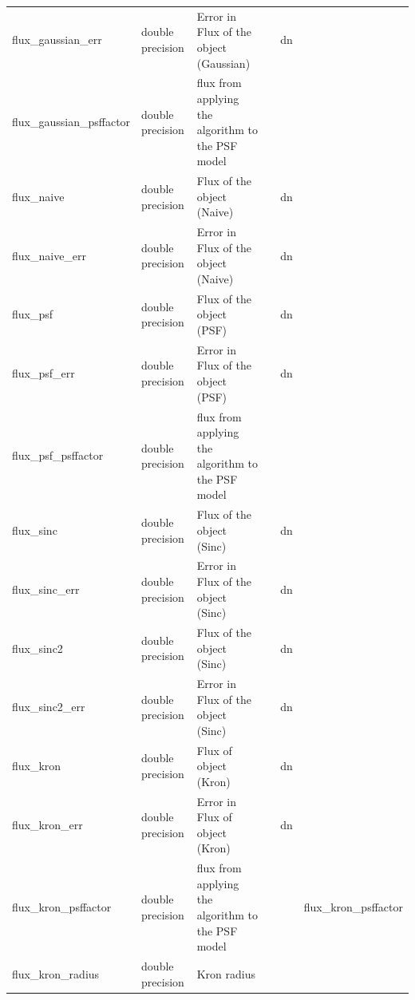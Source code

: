 \documentclass[12pt]{article}
\begin{document}
\begin{table}[thpb]
\begin{center}
{\begin{tabular}{llllll}
flux\_gaussian\_err & double precision & Error in Flux of the object (Gaussian)              &                            & dn         &   \\
flux\_gaussian\_psffactor & double precision & flux from applying the algorithm to the PSF model &                            &             &   \\
flux\_naive & double precision & Flux of the object (Naive)                          &                            & dn         &   \\
flux\_naive\_err & double precision & Error in Flux of the object (Naive)                 &                            & dn         &   \\
flux\_psf & double precision & Flux of the object (PSF)                            &                            & dn         &   \\
flux\_psf\_err & double precision & Error in Flux of the object (PSF)                   &                            & dn         &   \\
flux\_psf\_psffactor & double precision &  flux  from applying the algorithm to the PSF model  &                            &             &   \\
flux\_sinc & double precision & Flux of the object (Sinc)                           &                            & dn         &   \\
flux\_sinc\_err & double precision & Error in Flux of the object (Sinc)                  &                            & dn         &   \\
flux\_sinc2 & double precision & Flux of the object (Sinc)                           &                            & dn         &   \\
flux\_sinc2\_err & double precision & Error in Flux of the object (Sinc)                  &                            & dn         &   \\
flux\_kron & double precision & Flux of object (Kron)                               &                            & dn         &   \\
flux\_kron\_err & double precision & Error in Flux of object (Kron)                      &                            & dn         &   \\
flux\_kron\_psffactor & double precision & flux from applying the algorithm to the PSF model   &                  &             & flux\_kron\_psffactor \\
flux\_kron\_radius & double precision & Kron radius                                         &                            &            &   \\

\end{tabular}}
\end{center}
\end{table}
\end{document}
